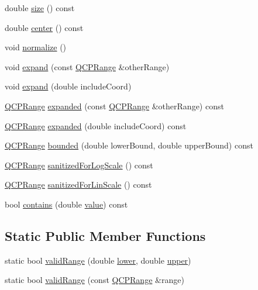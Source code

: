 \begin{DoxyCompactItemize}
\item 
double \mbox{\hyperlink{class_q_c_p_range_a62326e7cc4316b96df6a60813230e63f}{size}} () const
\item 
double \mbox{\hyperlink{class_q_c_p_range_af57d4a37a45d0101177ca30fae5d4ca8}{center}} () const
\item 
void \mbox{\hyperlink{class_q_c_p_range_af914a7740269b0604d0827c634a878a9}{normalize}} ()
\item 
void \mbox{\hyperlink{class_q_c_p_range_a0fa1bc8048be50d52bea93a8caf08305}{expand}} (const \mbox{\hyperlink{class_q_c_p_range}{Q\+C\+P\+Range}} \&other\+Range)
\item 
void \mbox{\hyperlink{class_q_c_p_range_a5fa977db0a4b7800075c629c62cf5e80}{expand}} (double include\+Coord)
\item 
\mbox{\hyperlink{class_q_c_p_range}{Q\+C\+P\+Range}} \mbox{\hyperlink{class_q_c_p_range_a9cbfb7cd06eac1839cae981e05c19633}{expanded}} (const \mbox{\hyperlink{class_q_c_p_range}{Q\+C\+P\+Range}} \&other\+Range) const
\item 
\mbox{\hyperlink{class_q_c_p_range}{Q\+C\+P\+Range}} \mbox{\hyperlink{class_q_c_p_range_af81d70f1add7233d73a19dcbe5decb2e}{expanded}} (double include\+Coord) const
\item 
\mbox{\hyperlink{class_q_c_p_range}{Q\+C\+P\+Range}} \mbox{\hyperlink{class_q_c_p_range_a22151e18d961d762d25721211e89c2e5}{bounded}} (double lower\+Bound, double upper\+Bound) const
\item 
\mbox{\hyperlink{class_q_c_p_range}{Q\+C\+P\+Range}} \mbox{\hyperlink{class_q_c_p_range_a3d66288d66e1d6df3636075eb42502ee}{sanitized\+For\+Log\+Scale}} () const
\item 
\mbox{\hyperlink{class_q_c_p_range}{Q\+C\+P\+Range}} \mbox{\hyperlink{class_q_c_p_range_a808751fdd9b17ef52327ba011df2e5f1}{sanitized\+For\+Lin\+Scale}} () const
\item 
bool \mbox{\hyperlink{class_q_c_p_range_ae9842b48b6d38dc5e9607358e3083cc8}{contains}} (double \mbox{\hyperlink{diffusion_8cpp_a4b41795815d9f3d03abfc739e666d5da}{value}}) const
\end{DoxyCompactItemize}
\subsection*{Static Public Member Functions}
\begin{DoxyCompactItemize}
\item 
static bool \mbox{\hyperlink{class_q_c_p_range_ab38bd4841c77c7bb86c9eea0f142dcc0}{valid\+Range}} (double \mbox{\hyperlink{class_q_c_p_range_aa3aca3edb14f7ca0c85d912647b91745}{lower}}, double \mbox{\hyperlink{class_q_c_p_range_ae44eb3aafe1d0e2ed34b499b6d2e074f}{upper}})
\item 
static bool \mbox{\hyperlink{class_q_c_p_range_a801b964752eaad6219be9d8a651ec2b3}{valid\+Range}} (const \mbox{\hyperlink{class_q_c_p_range}{Q\+C\+P\+Range}} \&range)
\end{DoxyCompactItemize}
